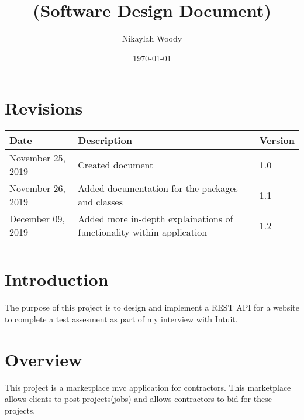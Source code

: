 \documentclass[a4paper,12pt]{article}
\begin{document}
\title{
 \large (Software Design Document)}
\author{Nikaylah Woody}
\date{\today}
\maketitle
{}
\newpage
\tableofcontents
\section*{Revisions}
\begin{table}[H]
\begin{tabular}{|l|l|l|}\hline 
Date & Description & Version \\ \hline 
November 25, 2019 & Created document & 1.0 \\ \hline 
November 26, 2019 & Added documentation for the packages and classes & 1.1 \\ \hline 
December 09, 2019 & Added more in-depth explainations of functionality within application & 1.2 \\ \hline
& & \\ \hline
\end{tabular}
\end{table}
\newpage

\section{Introduction}The purpose of this project is to design and implement a REST API for a website to complete a test assesment as part of my interview with Intuit.
\section{Overview}
\label{sec}This project is a marketplace mvc application for contractors. This marketplace allows clients to post projects(jobs) and allows contractors to bid for these projects.
\end{document}
